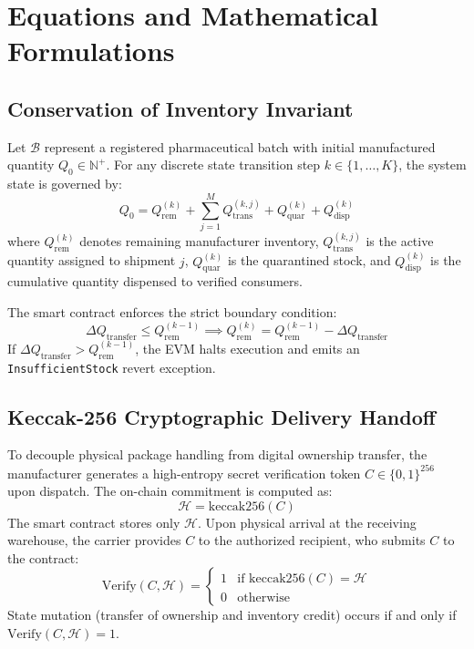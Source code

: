 \documentclass[pdflatex,sn-mathphys-num]{sn-jnl}
\theoremstyle{thmstyleone}
\theoremstyle{thmstyletwo}
\theoremstyle{thmstylethree}
\begin{document}
\section{Equations and Mathematical Formulations}\label{sec4}

\subsection{Conservation of Inventory Invariant}\label{sec4.1}
Let $\mathcal{B}$ represent a registered pharmaceutical batch with initial manufactured quantity $Q_0 \in \mathbb{N}^+$. For any discrete state transition step $k \in \{1, \dots, K\}$, the system state is governed by:
\begin{equation}
Q_0 = Q_{\text{rem}}^{(k)} + \sum_{j=1}^{M} Q_{\text{trans}}^{(k,j)} + Q_{\text{quar}}^{(k)} + Q_{\text{disp}}^{(k)}
\label{eq:conservation}
\end{equation}
where $Q_{\text{rem}}^{(k)}$ denotes remaining manufacturer inventory, $Q_{\text{trans}}^{(k,j)}$ is the active quantity assigned to shipment $j$, $Q_{\text{quar}}^{(k)}$ is the quarantined stock, and $Q_{\text{disp}}^{(k)}$ is the cumulative quantity dispensed to verified consumers.

The smart contract enforces the strict boundary condition:
\begin{equation}
\Delta Q_{\text{transfer}} \le Q_{\text{rem}}^{(k-1)} \implies Q_{\text{rem}}^{(k)} = Q_{\text{rem}}^{(k-1)} - \Delta Q_{\text{transfer}}
\label{eq:boundary}
\end{equation}
If $\Delta Q_{\text{transfer}} > Q_{\text{rem}}^{(k-1)}$, the EVM halts execution and emits an \texttt{InsufficientStock} revert exception.

\subsection{Keccak-256 Cryptographic Delivery Handoff}\label{sec4.2}
To decouple physical package handling from digital ownership transfer, the manufacturer generates a high-entropy secret verification token $C \in \{0,1\}^{256}$ upon dispatch. The on-chain commitment is computed as:
\begin{equation}
\mathcal{H} = \text{keccak256}(C)
\label{eq:hash}
\end{equation}
The smart contract stores only $\mathcal{H}$. Upon physical arrival at the receiving warehouse, the carrier provides $C$ to the authorized recipient, who submits $C$ to the contract:
\begin{equation}
\text{Verify}(C, \mathcal{H}) = 
\begin{cases} 
1 & \text{if } \text{keccak256}(C) = \mathcal{H} \\ 
0 & \text{otherwise} 
\end{cases}
\label{eq:verify}
\end{equation}
State mutation (transfer of ownership and inventory credit) occurs if and only if $\text{Verify}(C, \mathcal{H}) = 1$.
\end{document}
